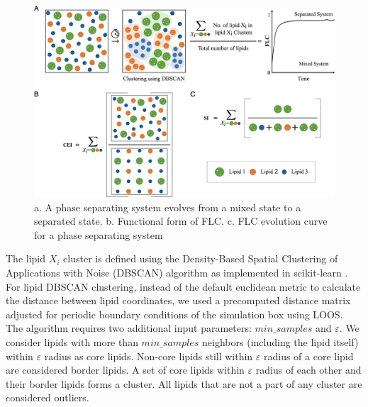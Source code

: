 \documentclass{biophys-new}
\begin{document}
\begin{figure}[hbt!]
\centering
\includegraphics[width=1\linewidth]{Figures/Main/2/placeholder.jpg}
\caption{a. A phase separating system evolves from a mixed state to a separated state. b. Functional form of FLC. c. FLC evolution curve for a phase separating system}
\label{fig2:view}
\end{figure}


The lipid $X_i$ cluster is defined using the Density-Based Spatial Clustering of Applications with Noise (DBSCAN) algorithm \cite{MartinEsterHans-PeterKriegelJiirgSander1996, Ester2017} as implemented in scikit-learn \cite{PedregosaF.VaroquauxG.GramfortA.MichelV.ThirionB.GriselO.BlondelM.PrettenhoferP.WeissR.andDubourgV.VanderplasJ.PassosA.CournapeauD.BrucherM.PerrotM.Duchesnay2011}.
For lipid DBSCAN clustering, instead of the default euclidean metric to calculate the distance between lipid coordinates, we used a precomputed distance matrix adjusted for periodic boundary conditions of the simulation box using LOOS.
The algorithm requires two additional input parameters: $min\_samples$ and $\varepsilon$.
We consider lipids with more than $min\_samples$ neighbors (including the lipid itself) within $\varepsilon$ radius as core lipids.
Non-core lipids still within $\varepsilon$ radius of a core lipid are considered border lipids.
A set of core lipids within $\varepsilon$ radius of each other and their border lipids forms a cluster.
All lipids that are not a part of any cluster are considered outliers.
\end{document}
